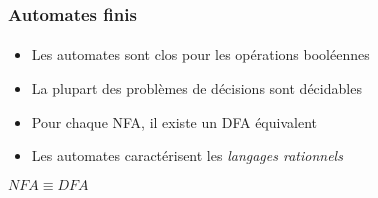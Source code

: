 \frametitle{Automates finis}
\framesubtitle{}

\begin{itemize}
	\item Les automates sont clos pour les opérations booléennes
	\item La plupart des problèmes de décisions sont décidables
	\item Pour chaque NFA, il existe un DFA équivalent
	\item Les automates caractérisent les \emph{langages rationnels}
\end{itemize}

\centering
\LARGE{$NFA \equiv DFA$}